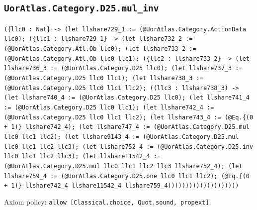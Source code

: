 \documentclass[11pt]{article}
\begin{document}
\subsection*{\texttt{UorAtlas.Category.D25.mul\_inv}}
\noindent\texttt{(\{llc0 : Nat\} -> (let llshare729\_1 := (@UorAtlas.Category.ActionData llc0); (\{llc1 : llshare729\_1\} -> (let llshare732\_2 := (@UorAtlas.Category.Atl.Ob llc0); (let llshare733\_2 := (@UorAtlas.Category.Atl.Ob llc0 llc1); (\{llc2 : llshare733\_2\} -> (let llshare736\_3 := (@UorAtlas.Category.D25 llc0); (let llshare737\_3 := (@UorAtlas.Category.D25 llc0 llc1); (let llshare738\_3 := (@UorAtlas.Category.D25 llc0 llc1 llc2); ((llc3 : llshare738\_3) -> (let llshare740\_4 := (@UorAtlas.Category.D25 llc0); (let llshare741\_4 := (@UorAtlas.Category.D25 llc0 llc1); (let llshare742\_4 := (@UorAtlas.Category.D25 llc0 llc1 llc2); (let llshare743\_4 := (@Eq.\{(0 + 1)\} llshare742\_4); (let llshare747\_4 := (@UorAtlas.Category.D25.mul llc0 llc1 llc2); (let llshare9143\_4 := (@UorAtlas.Category.D25.mul llc0 llc1 llc2 llc3); (let llshare752\_4 := (@UorAtlas.Category.D25.inv llc0 llc1 llc2 llc3); (let llshare11542\_4 := (@UorAtlas.Category.D25.mul llc0 llc1 llc2 llc3 llshare752\_4); (let llshare759\_4 := (@UorAtlas.Category.D25.one llc0 llc1 llc2); (@Eq.\{(0 + 1)\} llshare742\_4 llshare11542\_4 llshare759\_4))))))))))))))))))))}\par
\noindent Axiom policy: \texttt{allow [Classical.choice, Quot.sound, propext]}.\par
\end{document}
